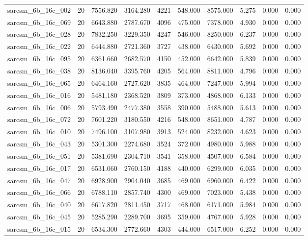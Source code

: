 \begin{tabular}{lrrrrrrrrr}
sarcsm\_6b\_16c\_002 & 20 & 7556.820 & 3164.280 & 4221 & 548.000 & 8575.000 & 5.275 & 0.000 & 0.000 \\
sarcsm\_6b\_16c\_069 & 20 & 6643.880 & 2787.670 & 4096 & 475.000 & 7378.000 & 4.930 & 0.000 & 0.000 \\
sarcsm\_6b\_16c\_028 & 20 & 7832.250 & 3229.350 & 4247 & 546.000 & 8250.000 & 6.237 & 0.000 & 0.000 \\
sarcsm\_6b\_16c\_022 & 20 & 6444.880 & 2721.360 & 3727 & 438.000 & 6430.000 & 5.692 & 0.000 & 0.000 \\
sarcsm\_6b\_16c\_095 & 20 & 6361.660 & 2682.570 & 4150 & 452.000 & 6642.000 & 5.839 & 0.000 & 0.000 \\
sarcsm\_6b\_16c\_038 & 20 & 8136.040 & 3395.760 & 4205 & 564.000 & 8811.000 & 4.796 & 0.000 & 0.000 \\
sarcsm\_6b\_16c\_065 & 20 & 6464.160 & 2727.620 & 3835 & 464.000 & 7247.000 & 5.994 & 0.000 & 0.000 \\
sarcsm\_6b\_16c\_016 & 20 & 5481.180 & 2368.520 & 3809 & 373.000 & 4868.000 & 6.133 & 0.000 & 0.000 \\
sarcsm\_6b\_16c\_006 & 20 & 5793.490 & 2477.380 & 3558 & 390.000 & 5488.000 & 5.613 & 0.000 & 0.000 \\
sarcsm\_6b\_16c\_072 & 20 & 7601.220 & 3180.550 & 4216 & 548.000 & 8651.000 & 4.787 & 0.000 & 0.000 \\
sarcsm\_6b\_16c\_010 & 20 & 7496.100 & 3107.980 & 3913 & 524.000 & 8232.000 & 4.623 & 0.000 & 0.000 \\
sarcsm\_6b\_16c\_043 & 20 & 5301.300 & 2274.680 & 3524 & 372.000 & 4980.000 & 5.988 & 0.000 & 0.000 \\
sarcsm\_6b\_16c\_051 & 20 & 5381.690 & 2304.710 & 3541 & 358.000 & 4507.000 & 6.584 & 0.000 & 0.000 \\
sarcsm\_6b\_16c\_017 & 20 & 6531.060 & 2760.150 & 4188 & 440.000 & 6299.000 & 6.035 & 0.000 & 0.000 \\
sarcsm\_6b\_16c\_047 & 20 & 6928.900 & 2904.040 & 3685 & 469.000 & 6960.000 & 6.422 & 0.000 & 0.000 \\
sarcsm\_6b\_16c\_066 & 20 & 6788.110 & 2857.740 & 4300 & 469.000 & 7023.000 & 5.438 & 0.000 & 0.000 \\
sarcsm\_6b\_16c\_040 & 20 & 6617.820 & 2811.450 & 3717 & 468.000 & 6171.000 & 5.984 & 0.000 & 0.000 \\
sarcsm\_6b\_16c\_045 & 20 & 5285.290 & 2289.700 & 3695 & 359.000 & 4767.000 & 5.928 & 0.000 & 0.000 \\
sarcsm\_6b\_16c\_015 & 20 & 6534.300 & 2772.660 & 4303 & 444.000 & 6517.000 & 6.252 & 0.000 & 0.000 \\

\end{tabular}
